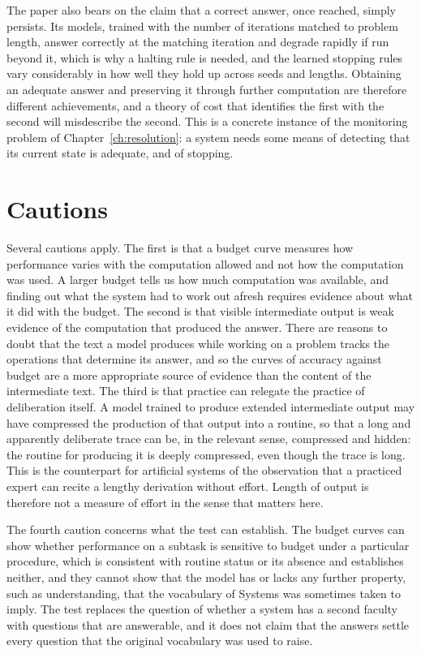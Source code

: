 \documentclass[11pt]{report}
\theoremstyle{remark}
\theoremstyle{definition}
\begin{document}
The paper also bears on the claim that a correct answer, once reached, simply persists. Its models, trained with the number of iterations matched to problem length, answer correctly at the matching iteration and degrade rapidly if run beyond it, which is why a halting rule is needed, and the learned stopping rules vary considerably in how well they hold up across seeds and lengths. Obtaining an adequate answer and preserving it through further computation are therefore different achievements, and a theory of cost that identifies the first with the second will misdescribe the second. This is a concrete instance of the monitoring problem of Chapter~\ref{ch:resolution}: a system needs some means of detecting that its current state is adequate, and of stopping.

\section{Cautions}

Several cautions apply. The first is that a budget curve measures how performance varies with the computation allowed and not how the computation was used. A larger budget tells us how much computation was available, and finding out what the system had to work out afresh requires evidence about what it did with the budget. The second is that visible intermediate output is weak evidence of the computation that produced the answer. There are reasons to doubt that the text a model produces while working on a problem tracks the operations that determine its answer, and so the curves of accuracy against budget are a more appropriate source of evidence than the content of the intermediate text. The third is that practice can relegate the practice of deliberation itself. A model trained to produce extended intermediate output may have compressed the production of that output into a routine, so that a long and apparently deliberate trace can be, in the relevant sense, compressed and hidden: the routine for producing it is deeply compressed, even though the trace is long. This is the counterpart for artificial systems of the observation that a practiced expert can recite a lengthy derivation without effort. Length of output is therefore not a measure of effort in the sense that matters here.

The fourth caution concerns what the test can establish. The budget curves can show whether performance on a subtask is sensitive to budget under a particular procedure, which is consistent with routine status or its absence and establishes neither, and they cannot show that the model has or lacks any further property, such as understanding, that the vocabulary of Systems was sometimes taken to imply. The test replaces the question of whether a system has a second faculty with questions that are answerable, and it does not claim that the answers settle every question that the original vocabulary was used to raise.
\end{document}
